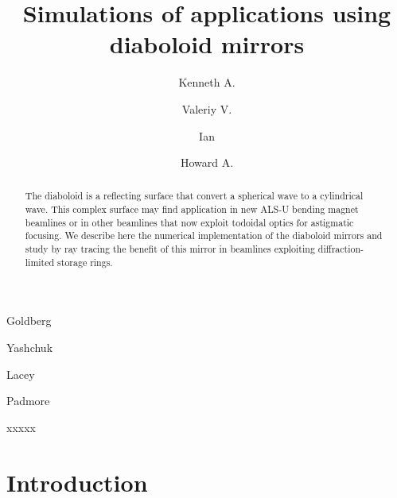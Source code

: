 \documentclass{iucr}              %
\begin{document}




\title{Simulations of applications using diaboloid mirrors}

\author[a]{Kenneth A.}{Goldberg}
\author[a]{Valeriy V.}{Yashchuk}
\author[a]{Ian}{Lacey}
\author[a]{Howard A.}{Padmore}




\begin{synopsis}
xxxxx
\end{synopsis}

\begin{abstract}
The diaboloid is a reflecting surface that convert a spherical wave to a cylindrical wave. This complex surface may find application in new ALS-U bending magnet beamlines or in other  beamlines that now exploit todoidal optics for astigmatic focusing. We describe here the numerical implementation of the diaboloid mirrors and study by ray tracing the benefit of this mirror in beamlines exploiting diffraction-limited storage rings.
\end{abstract}

\section{Introduction}
\end{document}
